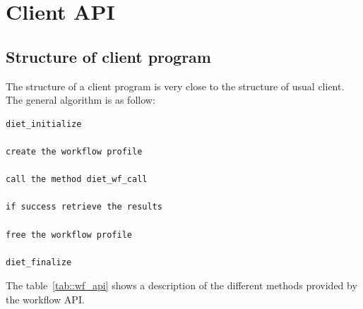 \section{Client API}

\subsection{Structure of client program}
\label{sec:client_prg}

The structure of a client program is very close to the structure of
usual \diet client. The general algorithm is as follow:

\begin{verbatim}
diet_initialize

create the workflow profile

call the method diet_wf_call

if success retrieve the results

free the workflow profile

diet_finalize
\end{verbatim}

The table~\ref{tab::wf_api} shows a description of the different
methods provided by the \diet workflow API.

